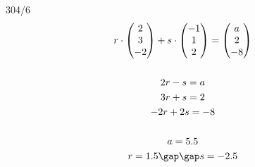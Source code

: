 \begin{exercise}{304/6}
  \begin{gather*}
    r \cdot \begin{pmatrix}2 \\ 3 \\ -2\end{pmatrix} + s \cdot \begin{pmatrix}-1 \\ 1 \\ 2\end{pmatrix} = \begin{pmatrix}a \\ 2 \\ -8\end{pmatrix} \\\\
    2r - s = a \\
    3r + s = 2 \\
    -2r + 2s = -8 \\\\
    a = 5.5 \\
    r = 1.5 \gap\gap s = -2.5
  \end{gather*}
\end{exercise}
